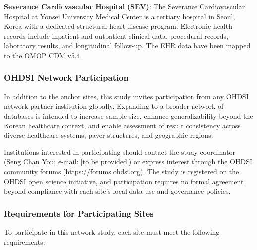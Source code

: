 \documentclass[
  12pt,
]{article}
\begin{document}
\textbf{Severance Cardiovascular Hospital (SEV)}: The Severance
Cardiovascular Hospital at Yonsei University Medical Center is a
tertiary hospital in Seoul, Korea with a dedicated structural heart
disease program. Electronic health records include inpatient and
outpatient clinical data, procedural records, laboratory results, and
longitudinal follow-up. The EHR data have been mapped to the OMOP CDM
v5.4.

\subsubsection{OHDSI Network
Participation}\label{ohdsi-network-participation}

In addition to the anchor sites, this study invites participation from
any OHDSI network partner institution globally. Expanding to a broader
network of databases is intended to increase sample size, enhance
generalizability beyond the Korean healthcare context, and enable
assessment of result consistency across diverse healthcare systems,
payer structures, and geographic regions.

Institutions interested in participating should contact the study
coordinator (Seng Chan You; e-mail: {[}to be provided{]}) or express
interest through the OHDSI community forums
(\url{https://forums.ohdsi.org}). The study is registered on the OHDSI
open science initiative, and participation requires no formal agreement
beyond compliance with each site's local data use and governance
policies.

\subsubsection{Requirements for Participating
Sites}\label{requirements-for-participating-sites}

To participate in this network study, each site must meet the following
requirements:

\begingroup\fontsize{8}{10}\selectfont
\end{document}
